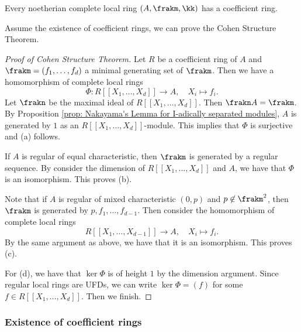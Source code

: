         \begin{theorem}\label{thm: existence of coefficient rings}
            Every noetherian complete local ring \((A,\frakm,\kk)\) has a coefficient ring.
        \end{theorem}

        Assume the existence of coefficient rings, we can prove the Cohen Structure Theorem.

        \begin{proof}[Proof of Cohen Structure Theorem]
            Let \(R\) be a coefficient ring of \(A\) and \(\frakm = (f_1, \ldots, f_d)\) a minimal generating set of \(\frakm\).
            Then we have a homomorphism of complete local rings 
            \[ \Phi: R[[X_1, \ldots, X_d]] \to A, \quad X_i \mapsto f_i. \] 
            Let \(\frakn\) be the maximal ideal of \(R[[X_1, \ldots, X_d]]\).
            Then \(\frakn A = \frakm\).
            By Proposition \ref{prop: Nakayama's Lemma for I-adically separated modules}, \(A\) is generated by \(1\) as an \(R[[X_1, \ldots, X_d]]\)-module.
            This implies that \(\Phi\) is surjective and (a) follows.

            If \(A\) is regular of equal characteristic, then \(\frakm\) is generated by a regular sequence.
            By consider the dimension of \(R[[X_1, \ldots, X_d]]\) and \(A\), we have that \(\Phi\) is an isomorphism.
            This proves (b).
            
            Note that if \(A\) is regular of mixed characteristic \((0,p)\) and \(p \not\in \frakm^2\), then \(\frakm\) is generated by \(p, f_1, \ldots, f_{d-1}\).
            Then consider the homomorphism of complete local rings
            \[  R[[X_1, \ldots, X_{d-1}]] \to A, \quad X_i \mapsto f_i.\]
            By the same argument as above, we have that it is an isomorphism.
            This proves (c).

            For (d), we have that \(\ker \Phi\) is of height \(1\) by the dimension argument.
            Since regular local rings are UFDs, we can write \(\ker \Phi = (f)\) for some \(f \in R[[X_1, \ldots, X_d]]\).
            Then we finish.
        \end{proof}

    \subsubsection{Existence of coefficient rings}

            
